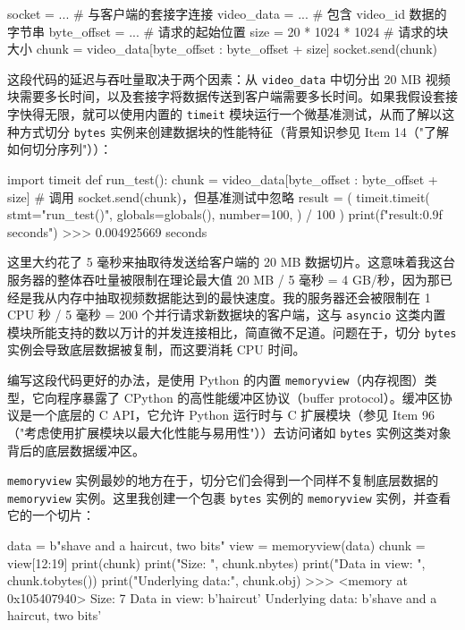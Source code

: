 \begin{codebox}[python]
socket = ...             # 与客户端的套接字连接
video_data = ...         # 包含 video_id 数据的字节串
byte_offset = ...        # 请求的起始位置
size = 20 * 1024 * 1024  # 请求的块大小
chunk = video_data[byte_offset : byte_offset + size]
socket.send(chunk)
\end{codebox}

这段代码的延迟与吞吐量取决于两个因素：从 \texttt{video\_data} 中切分出 20 MB 视频块需要多长时间，以及套接字将数据传送到客户端需要多长时间。如果我假设套接字快得无限，就可以使用内置的 \texttt{timeit} 模块运行一个微基准测试，从而了解以这种方式切分 \texttt{bytes} 实例来创建数据块的性能特征（背景知识参见 Item 14（"了解如何切分序列"））：

\begin{codebox}[python]
import timeit
def run_test():
    chunk = video_data[byte_offset : byte_offset + size]
    # 调用 socket.send(chunk)，但基准测试中忽略
    result = (
        timeit.timeit(
            stmt="run_test()",
            globals=globals(),
            number=100,
        )
        / 100
    )
    print(f"{result:0.9f} seconds")
>>>
0.004925669 seconds
\end{codebox}

这里大约花了 5 毫秒来抽取待发送给客户端的 20 MB 数据切片。这意味着我这台服务器的整体吞吐量被限制在理论最大值 20 MB / 5 毫秒 = 4 GB/秒，因为那已经是我从内存中抽取视频数据能达到的最快速度。我的服务器还会被限制在 1 CPU 秒 / 5 毫秒 = 200 个并行请求新数据块的客户端，这与 \texttt{asyncio} 这类内置模块所能支持的数以万计的并发连接相比，简直微不足道。问题在于，切分 \texttt{bytes} 实例会导致底层数据被复制，而这要消耗 CPU 时间。

编写这段代码更好的办法，是使用 Python 的内置 \texttt{memoryview}（内存视图）类型，它向程序暴露了 CPython 的高性能缓冲区协议（buffer protocol）。缓冲区协议是一个底层的 C API，它允许 Python 运行时与 C 扩展模块（参见 Item 96（"考虑使用扩展模块以最大化性能与易用性"））去访问诸如 \texttt{bytes} 实例这类对象背后的底层数据缓冲区。

\texttt{memoryview} 实例最妙的地方在于，切分它们会得到一个同样不复制底层数据的 \texttt{memoryview} 实例。这里我创建一个包裹 \texttt{bytes} 实例的 \texttt{memoryview} 实例，并查看它的一个切片：

\begin{codebox}[python]
data = b"shave and a haircut, two bits"
view = memoryview(data)
chunk = view[12:19]
print(chunk)
print("Size:           ", chunk.nbytes)
print("Data in view:   ", chunk.tobytes())
print("Underlying data:", chunk.obj)
>>>
<memory at 0x105407940>
Size:            7
Data in view:    b'haircut'
Underlying data: b'shave and a haircut, two bits'
\end{codebox}

